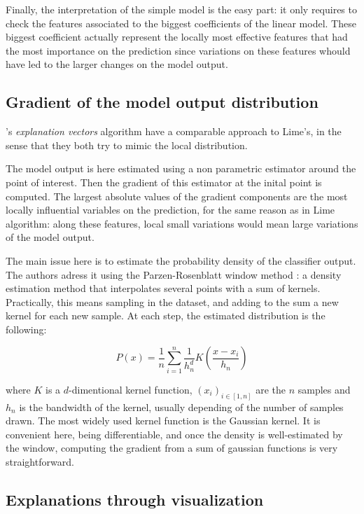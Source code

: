 \documentclass[a4paper,11pt]{kth-mag}
\begin{document}
Finally, the interpretation of the simple model is the easy part: it only requires to check the features associated to the biggest coefficients of the linear model. These biggest coefficient actually represent the locally most effective features that had the most importance on the prediction since variations on these features whould have led to the larger changes on the model output.

\subsection{Gradient of the model output distribution}

\citeauthor{explvect}'s \textit{explanation vectors} algorithm \cite{explvect} have a comparable approach to Lime's, in the sense that they both try to mimic the local distribution.

The model output is here estimated using a non parametric estimator around the point of interest. Then the gradient of this estimator at the inital point is computed. The largest absolute values of the gradient components are the most locally influential variables on the prediction, for the same reason as in Lime algorithm: along these features, local small variations would mean large variations of the model output.

The main issue here is to estimate the probability density of the classifier output. The authors adress it using the Parzen-Rosenblatt window method \cite{parzen} \cite{rosenblatt}: a density estimation method that interpolates several points with a sum of kernels. Practically, this means sampling in the dataset, and adding to the sum a new kernel for each new sample. At each step, the estimated distribution is the following:

\[
	P(x) = \frac{1}{n} \sum_{i=1}^n \frac1{h_n^d} K \left( \frac{x - x_i}{h_n} \right)
\]

where $K$ is a $d$-dimentional kernel function, $(x_i)_{i \in [1,n]}$ are the $n$ samples and $h_n$ is the bandwidth of the kernel, usually depending of the number of samples drawn. The most widely used kernel function is the Gaussian kernel. It is convenient here, being differentiable, and once the density is well-estimated by the window, computing the gradient from a sum of gaussian functions is very straightforward.

\subsection{Explanations through visualization}
\end{document}
